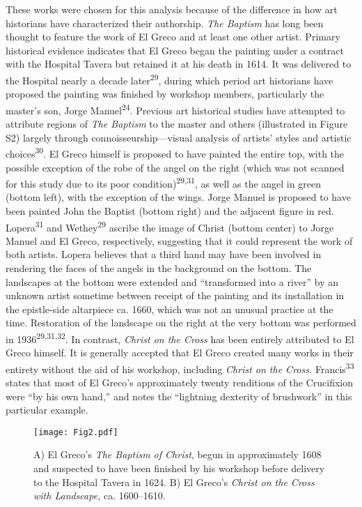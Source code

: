 \documentclass[11pt]{article}
\begin{document}
These works were chosen for this analysis because of the difference in
how art historians have characterized their authorship. \emph{The
Baptism} has long been thought to feature the work of El Greco and at
least one other artist. Primary historical evidence indicates that El
Greco began the painting under a contract with the Hospital Tavera but
retained it at his death in 1614. It was delivered to the Hospital
nearly a decade later\textsuperscript{29}, during which period art
historians have proposed the painting was finished by workshop members,
particularly the master's son, Jorge Manuel\textsuperscript{24}.
Previous art historical studies have attempted to attribute regions of
\emph{The Baptism} to the master and others (illustrated in Figure S2)
largely through connoisseurship---visual analysis of artists' styles and
artistic choices\textsuperscript{30}. El Greco himself is proposed to
have painted the entire top, with the possible exception of the robe of
the angel on the right (which was not scanned for this study due to its
poor condition)\textsuperscript{29,31}, as well as the angel in green
(bottom left), with the exception of the wings. Jorge Manuel is proposed
to have been painted John the Baptist (bottom right) and the adjacent
figure in red. Lopera\textsuperscript{31} and Wethey\textsuperscript{29}
ascribe the image of Christ (bottom center) to Jorge Manuel and El
Greco, respectively, suggesting that it could represent the work of both
artists. Lopera believes that a third hand may have been involved in
rendering the faces of the angels in the background on the bottom. The
landscapes at the bottom were extended and ``transformed into a river''
by an unknown artist sometime between receipt of the painting and its
installation in the epistle-side altarpiece ca. 1660, which was not an
unusual practice at the time. Restoration of the landscape on the right
at the very bottom was performed in 1936\textsuperscript{29,31,32}. In
contrast, \emph{Christ on the Cross} has been entirely attributed to El
Greco himself. It is generally accepted that El Greco created many works
in their entirety without the aid of his workshop, including
\emph{Christ on the Cross.} Francis\textsuperscript{33} states that most
of El Greco's approximately twenty renditions of the Crucifixion were
``by his own hand,'' and notes the ``lightning dexterity of brushwork''
in this particular example.

\begin{figure}
\texttt{[image: Fig2.pdf]}
\caption{A) El Greco's \emph{The Baptism of Christ}, begun
in approximately 1608 and suspected to have been finished by his
workshop before delivery to the Hospital Tavera in 1624. B) El Greco's
\emph{Christ on the Cross with Landscape,} ca. 1600--1610.}
\end{figure}
\end{document}
